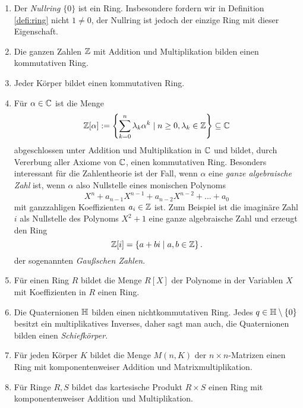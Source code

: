 \documentclass{book}
\begin{document}
\begin{exas}
    \label{exas:ringe}
    \begin{enumerate}
        \item Der \emph{Nullring} $\{0\}$ ist ein Ring. Insbesondere fordern
            wir in Definition \ref{defi:ring} nicht $1 \ne 0$, der Nullring ist
            jedoch der einzige Ring mit dieser Eigenschaft.
        \item Die ganzen Zahlen $\mathbb{Z}$ mit Addition und Multiplikation bilden einen kommutativen Ring. 
        \item Jeder Körper bildet einen kommutativen Ring. 
        \item Für $\alpha \in \mathbb{C}$ ist die Menge 
            \[
                \mathbb{Z}[\alpha] := \left\{\sum_{k=0}^n \lambda_k \alpha^k \; | \; n \ge 0, \lambda_k \in \mathbb{Z} \right\} \subseteq \mathbb{C}
            \]
            abgeschlossen unter Addition und Multiplikation in $\mathbb{C}$ und bildet,
            durch Vererbung aller Axiome von $\mathbb{C}$, einen kommutativen Ring.
            Besonders interessant für die Zahlentheorie ist der Fall, wenn
            $\alpha$ eine \emph{ganze algebraische Zahl} ist, wenn $\alpha$
            also Nullstelle eines monischen Polynoms
            \[
                X^n + a_{n-1} X^{n-1} + a_{n-2} X^{n-2} + ... + a_0
            \]
            mit ganzzahligen Koeffizienten $a_i \in \mathbb{Z}$ ist. 
            Zum Beispiel ist die imaginäre Zahl $i$ als Nullstelle des Polynoms
            $X^2 + 1$ eine ganze algebraische Zahl und erzeugt den Ring
            \[
                \mathbb{Z}[i] = \left\{ a + b i \; | \; a,b \in \mathbb{Z} \right\}.
            \]
            der sogenannten \emph{Gaußschen Zahlen}.

        \item Für einen Ring $R$ bildet die Menge $R[X]$ der Polynome in der
            Variablen $X$ mit Koeffizienten in $R$ einen Ring.
        \item Die Quaternionen $\mathbb{H}$ bilden einen nichtkommutativen Ring. Jedes $q \in \mathbb{H}
            \setminus \{0\}$ besitzt ein multiplikatives Inverses, daher
            sagt man auch, die Quaternionen bilden einen {\em Schiefkörper}. 
        \item Für jeden Körper $K$ bildet die Menge $M(n,K)$ der $n \times
            n$-Matrizen einen Ring mit komponentenweiser Addition und
            Matrixmultiplikation.
        \item Für Ringe $R,S$ bildet das kartesische Produkt $R \times S$
            einen Ring mit komponentenweiser Addition und Multiplikation.
    \end{enumerate}
\end{exas}
\end{document}
